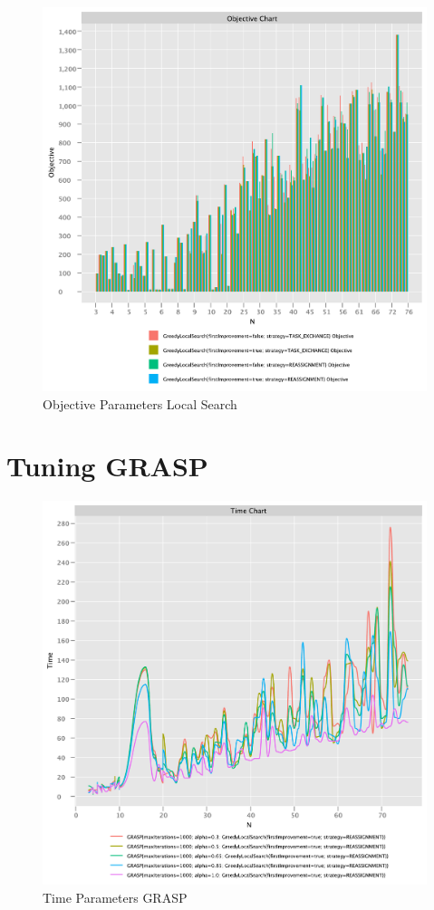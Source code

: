 \documentclass{article}
\begin{document}
\begin{figure}
    \centering
    \includegraphics[width=1\textwidth]{./documentation/assets/localSearchParams.objectiveChart.pdf}
    \caption{Objective Parameters Local Search}
    \label{fig:local_time}
\end{figure}\FloatBarrier

\newpage

\section{Tuning GRASP}

\begin{figure}[!h]
    \centering
    \includegraphics[width=1\textwidth]{./documentation/assets/GRASPParams.timeChart.pdf}
    \caption{Time Parameters GRASP}
    \label{fig:grasp_time}
\end{figure}\FloatBarrier
\end{document}
